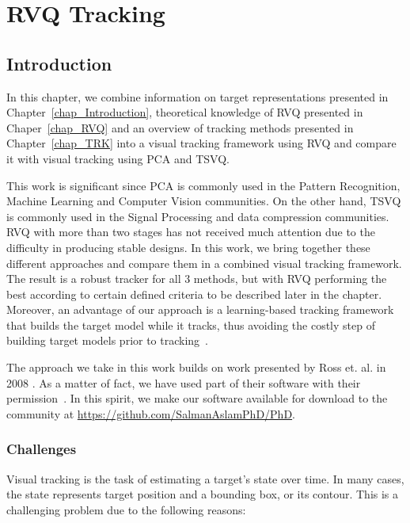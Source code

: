 %
%
%

\chapter{RVQ Tracking}
\label{chap_RVQ_TRK}	
\section{Introduction}
In this chapter, we combine information on target representations presented in Chapter~\ref{chap_Introduction}, theoretical knowledge of RVQ presented in Chaper~\ref{chap_RVQ} and an overview of tracking methods presented in Chapter~\ref{chap_TRK} into a visual tracking framework using RVQ and compare it with visual tracking using PCA and TSVQ.  

This work is significant since PCA is commonly used in the Pattern Recognition, Machine Learning and Computer Vision communities.  On the other hand, TSVQ is commonly used in the Signal Processing and data compression communities.  RVQ with more than two stages has not received much attention due to the difficulty in producing stable designs.  In this work, we bring together these different approaches and compare them in a combined visual tracking framework.  The result is a robust tracker for all 3 methods, but with RVQ performing the best according to certain defined criteria to be described later in the chapter.  Moreover, an advantage of our approach is a learning-based tracking framework that builds the target model while it tracks, thus avoiding the costly step of building target models prior to tracking~\cite{2004_JNL_SVMtracking_Avidan}.

The approach we take in this work builds on work presented by Ross et. al. in 2008 \cite{2008_JNL_subspaceTRK_Ross}.  As a matter of fact, we have used part of their software with their permission~\cite{2008_SFT_Ross}.  In this spirit, we make our software available for download to the community at \url{https://github.com/SalmanAslamPhD/PhD}.  

\subsection{Challenges}
Visual tracking is the task of estimating a target's state over time.  In many cases, the state represents target position and a bounding box, or its contour.  This is a challenging problem due to the following reasons:

